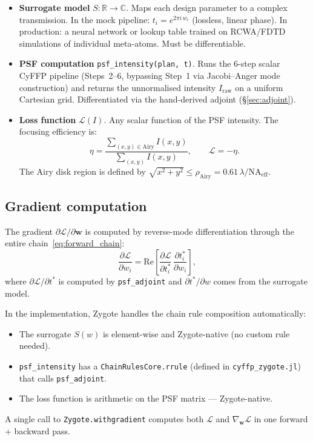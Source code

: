 \documentclass[11pt,a4paper]{article}
\begin{document}
\begin{itemize}[nosep]
\item \textbf{Surrogate model} $S: \mathbb{R} \to \mathbb{C}$.
  Maps each design parameter to a complex transmission.  In the mock
  pipeline: $t_i = e^{2\pi i\,w_i}$ (lossless, linear phase).  In
  production: a neural network or lookup table trained on RCWA/FDTD
  simulations of individual meta-atoms.  Must be differentiable.

\item \textbf{PSF computation} \texttt{psf\_intensity(plan, t)}.
  Runs the 6-step scalar CyFFP pipeline (Steps~2--6, bypassing Step~1
  via Jacobi--Anger mode construction) and returns the unnormalised
  intensity $I_{\mathrm{raw}}$ on a uniform Cartesian grid.
  Differentiated via the hand-derived adjoint (\S\ref{sec:adjoint}).

\item \textbf{Loss function} $\mathcal{L}(I)$.
  Any scalar function of the PSF intensity.  The focusing efficiency is:
  \begin{equation}\label{eq:loss_eff}
    \eta = \frac{\sum_{(x,y)\in\text{Airy}} I(x,y)}{\sum_{(x,y)} I(x,y)},
    \qquad
    \mathcal{L} = -\eta.
  \end{equation}
  The Airy disk region is defined by $\sqrt{x^2+y^2} \le \rho_{\mathrm{Airy}}
  = 0.61\,\lambda / \mathrm{NA}_{\mathrm{eff}}$.
\end{itemize}

\subsection{Gradient computation}

The gradient $\partial\mathcal{L}/\partial\mathbf{w}$ is computed by
reverse-mode differentiation through the entire chain~\eqref{eq:forward_chain}:
\begin{equation}
  \frac{\partial\mathcal{L}}{\partial w_i}
  = \mathrm{Re}\!\left[
    \frac{\partial\mathcal{L}}{\partial t_i^*}\,
    \frac{\partial t_i^*}{\partial w_i}
  \right],
\end{equation}
where $\partial\mathcal{L}/\partial t^*$ is computed by \texttt{psf\_adjoint}
and $\partial t^*/\partial w$ comes from the surrogate model.

In the implementation, Zygote handles the chain rule composition
automatically:
\begin{itemize}[nosep]
  \item The surrogate $S(w)$ is element-wise and Zygote-native (no custom rule needed).
  \item \texttt{psf\_intensity} has a \texttt{ChainRulesCore.rrule} (defined in
        \texttt{cyffp\_zygote.jl}) that calls \texttt{psf\_adjoint}.
  \item The loss function is arithmetic on the PSF matrix --- Zygote-native.
\end{itemize}
A single call to \texttt{Zygote.withgradient} computes both $\mathcal{L}$ and
$\nabla_{\mathbf{w}}\mathcal{L}$ in one forward + backward pass.
\end{document}
